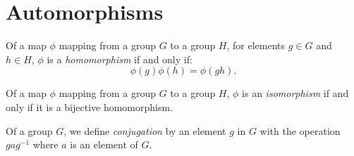 \section{Automorphisms}

\begin{definition}[Endomorphism]
    \label{definition : Endomorphism}
    \leanok
    Of a map \( \phi \) mapping from a group \( G \) to a group \( H \), for
    elements \( g \in G \) and \( h \in H \), \( \phi \) is a
    \emph{homomorphism} if and only if:
    \[
        \phi(g)\phi(h) = \phi(gh).
    \]
\end{definition}

\begin{definition}[Automorphism]
    \label{definition : Automorphism}
    \leanok
    Of a map \( \phi \) mapping from a group \( G \) to a group \( H \), \( \phi
    \) is an \emph{isomorphism} if and only if it is a bijective homomorphism.
\end{definition}

\begin{definition}[Conjugate]
    \label{definition : Conjugate}
    \leanok
    Of a group \( G \), we define \emph{conjugation} by an element
    \( g \) in \( G \) with the operation \( g ag^{-1} \) where \( a \) is an
    element of \( G \).
\end{definition}

